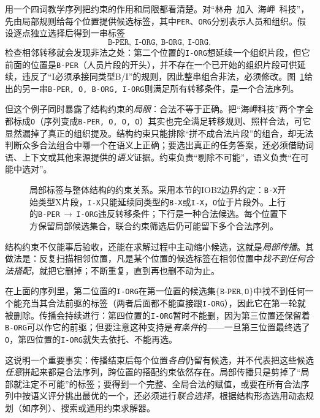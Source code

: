 用一个四词教学序列把约束的作用和局限都看清楚。对“林舟~加入~海岬~科技”，先由局部规则给每个位置提供候选标签，其中\texttt{PER}、\texttt{ORG}分别表示人员和组织。假设逐点独立选择后得到一串标签
\[
  \texttt{B-PER},\ \texttt{I-ORG},\ \texttt{B-ORG},\ \texttt{I-ORG}.
\]
检查相邻转移就会发现非法之处：第二个位置的\texttt{I-ORG}想延续一个组织片段，但它前面的位置是\texttt{B-PER}（人员片段的开头），并不存在一个已开始的组织片段可供延续，违反了“I必须承接同类型B/I”的规则，因此整串组合非法，必须修改。图~\ref{fig:rule-based-knowledge-acquisition-sequence-constraint}给出的另一串\texttt{B-PER, O, B-ORG, I-ORG}则满足所有转移条件，是一个合法序列。

但这个例子同时暴露了结构约束的\emph{局限}：合法不等于正确。把“海岬科技”两个字全都标成\texttt{O}（序列变成\texttt{B-PER, O, O, O}）其实也完全满足转移规则、照样合法，可它显然漏掉了真正的组织提及。结构约束只能排除“拼不成合法片段”的组合，却无法判断众多合法组合中哪一个在语义上正确；要选出真正的任务答案，还必须借助词语、上下文或其他来源提供的\emph{语义}证据。约束负责“剔除不可能”，语义负责“在可能中选对”。

\begin{figure}[htbp]
  \centering
  
  \caption{局部标签与整体结构的约束关系。采用本节的IOB2边界约定：\texttt{B-X}开始类型X片段，\texttt{I-X}只能延续同类型的\texttt{B-X}或\texttt{I-X}，\texttt{O}位于片段外。上行的\texttt{B-PER}\,$\to$\,\texttt{I-ORG}违反转移条件；下行是一种合法候选。每个位置下方保留局部候选集合，联合约束筛选后仍可能留下多个合法序列。}
  \label{fig:rule-based-knowledge-acquisition-sequence-constraint}
\end{figure}

结构约束不仅能事后验收，还能在求解过程中主动缩小候选，这就是\emph{局部传播}。其做法是：反复扫描相邻位置，凡是某个位置的候选标签在相邻位置中\emph{找不到任何合法搭配}，就把它删掉；不断重复，直到再也删不动为止。

在上面的序列里，第二位置的\texttt{I-ORG}在第一位置的候选集$\{\texttt{B-PER},\texttt{O}\}$中找不到任何一个能充当其合法前驱的标签（两者后面都不能直接跟\texttt{I-ORG}），因此它在第一轮就被删除。传播会持续进行：第四位置的\texttt{I-ORG}暂时不能删，因为第三位置还保留着\texttt{B-ORG}可以作它的前驱；但要注意这种支持是\emph{有条件}的——一旦第三位置最终选了\texttt{O}，第四位置的\texttt{I-ORG}就失去依托、不能再选。

这说明一个重要事实：传播结束后每个位置\emph{各自}仍留有候选，并不代表把这些候选\emph{任意}拼起来都是合法序列，跨位置的搭配约束依然存在。局部传播只是剪掉了“局部就注定不可能”的标签；要得到一个完整、全局合法的赋值，或要在所有合法序列中按语义评分挑出最优的一个，还必须进行\emph{联合选择}，根据结构形态选用动态规划（如序列）、搜索或通用约束求解器。

